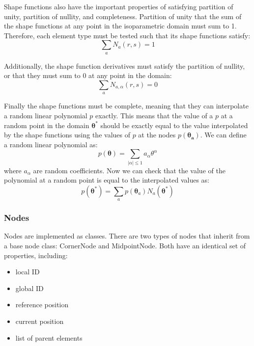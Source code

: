 \documentclass[]{spie}  %
\begin{document}
Shape functions also have the important properties of satisfying partition of unity, partition of nullity, and completeness. Partition of unity that the sum of the shape functions at any point in the isoparametric domain must sum to 1. Therefore, each element type must be tested such that its shape functions satisfy:
\begin{equation}
\label{eq: partition of unity}
\sum\limits_{a} N_a(r,s) = 1
\end{equation}

Additionally, the shape function derivatives must satisfy the partition of nullity, or that they must sum to 0 at any point in the domain:
\begin{equation}
\label{eq: partition of nullity}
\sum\limits_{a} N_{a,\alpha}(r,s) = 0
\end{equation}

Finally the shape functions must be complete, meaning that they can interpolate a random linear polynomial $p$ exactly. This means that the value of a $p$ at a random point in the domain $\bm{\theta^*}$ should be exactly equal to the value interpolated by the shape functions using the values of $p$ at the nodes $p(\bm{\theta_a})$. We can define a random linear polynomial as:
\begin{equation}
p(\bm{\theta}) = \sum\limits_{|\alpha| \leq 1} a_{\alpha}\theta^{\alpha}
\end{equation}
where $a_{\alpha}$ are random coefficients. Now we can check that the value of the polynomial at a random point is equal to the interpolated values as:
\begin{equation}
\label{eq: completeness}
p(\bm{\theta^*}) = \sum\limits_{a} p(\bm{\theta}_a) N_a(\bm{\theta^*})
\end{equation}

\subsubsection{Nodes}
Nodes are implemented as classes. There are two types of nodes that inherit from a base node class: CornerNode and MidpointNode. Both have an identical set of properties, including:
\begin{itemize}
	\item local ID
	\item global ID
	\item reference position
	\item current position
	\item list of parent elements
\end{itemize} 
\end{document}
